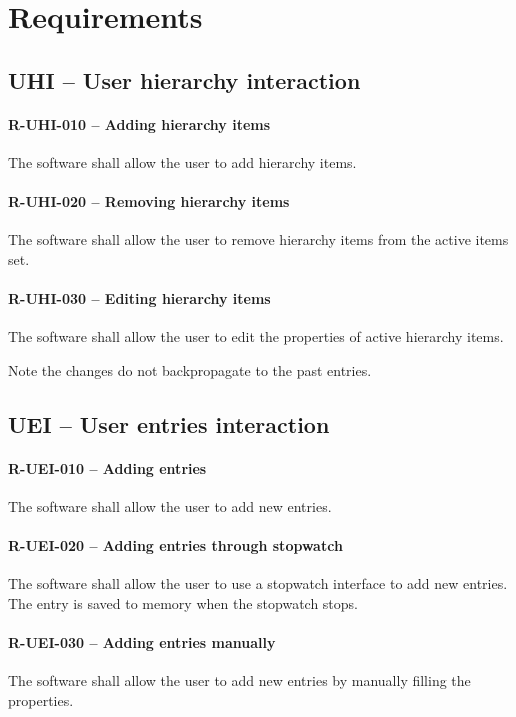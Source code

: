 \section{Requirements}
\subsection{UHI -- User hierarchy interaction}
\paragraph{R-UHI-010 -- Adding hierarchy items}
The software shall allow the user to add hierarchy items.

\paragraph{R-UHI-020 -- Removing hierarchy items}
The software shall allow the user to remove hierarchy items
from the active items set.

\paragraph{R-UHI-030 -- Editing hierarchy items}
The software shall allow the user to edit the properties of
active hierarchy items.

Note the changes do not backpropagate to the past entries.

\subsection{UEI -- User entries interaction}
\paragraph{R-UEI-010 -- Adding entries}
The software shall allow the user to add new entries.

\paragraph{R-UEI-020 -- Adding entries through stopwatch}
The software shall allow the user to use a stopwatch interface to
add new entries. The entry is saved to memory when the stopwatch stops.

\paragraph{R-UEI-030 -- Adding entries manually}
The software shall allow the user to add new entries by manually filling
the properties.

